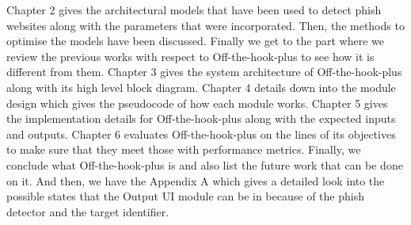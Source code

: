 Chapter 2 gives the architectural models that have been used to detect phish websites along with the parameters that were incorporated. Then, the methods to optimise the models have been discussed. Finally we get to the part where we review the previous works with respect to Off-the-hook-plus to see how it is different from them. Chapter 3 gives the system architecture of Off-the-hook-plus along with its high level block diagram. Chapter 4 details down into the module design which gives the pseudocode of how each module works. Chapter 5 gives the implementation details for Off-the-hook-plus along with the expected inputs and outputs. Chapter 6 evaluates Off-the-hook-plus on the lines of its objectives to make sure that they meet those with performance metrics. Finally, we conclude what Off-the-hook-plus is and also list the future work that can be done on it. And then, we have the Appendix A which gives a detailed look into the possible states that the  Output UI module can be in because of the phish detector and the target identifier.









